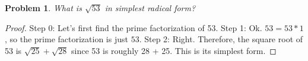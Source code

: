 \documentclass{article}
\newtheorem{theorem}{Problem}
\begin{document}
\begin{theorem}
What is $\sqrt{53}$ in simplest radical form?
\end{theorem}

\begin{proof}
Step 0: Let's first find the prime factorization of 53.
Step 1: Ok. $53 = 53 * 1$, so the prime factorization is just $53$.
Step 2: Right. Therefore, the square root of 53 is $\sqrt{25}+\sqrt{28}$ since 53 is roughly 28 + 25. This is its simplest form.
\end{proof}
\end{document}
